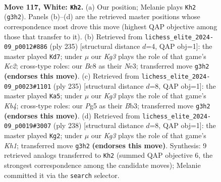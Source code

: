 \documentclass[11pt]{article}
\begin{document}
\clearpage

\begin{figure}[p]\centering
\begin{subfigure}{0.46\textwidth}\centering
\resizebox{\linewidth}{!}{%
\newchessgame
\chessboard[
  setfen={2B5/6k1/8/6PP/8/6K1/8/1n6 w - - 3 117},
  showmover=false,
  pgfstyle=straightmove, color=movearrow, markmove={g3-h2}
]}
\caption{}
\end{subfigure}\hfill
\begin{subfigure}{0.46\textwidth}\centering
\resizebox{\linewidth}{!}{%
\newchessgame
\chessboard[
  setfen={8/2k1N3/8/2p5/p7/2K1n3/8/8 b - - 13 118},
  showmover=false,
  pgfstyle=straightmove, color=movearrow, markmove={c7-d7}
]}
\caption{}
\end{subfigure}
\\[4pt]
\begin{subfigure}{0.46\textwidth}\centering
\resizebox{\linewidth}{!}{%
\newchessgame
\chessboard[
  setfen={8/8/8/1k6/8/pb6/8/1K6 b - - 85 118},
  showmover=false,
  pgfstyle=straightmove, color=movearrow, markmove={b5-a5}
]}
\caption{}
\end{subfigure}\hfill
\begin{subfigure}{0.46\textwidth}\centering
\resizebox{\linewidth}{!}{%
\newchessgame
\chessboard[
  setfen={8/5k2/8/5P2/4n3/8/8/7K w - - 81 120},
  showmover=false,
  pgfstyle=straightmove, color=movearrow, markmove={h1-g2}
]}
\caption{}
\end{subfigure}
\caption{\textbf{Move 117, White: \texttt{Kh2}.} (a) Our position; Melanie plays \texttt{Kh2} (\texttt{g3h2}). Panels (b)--(d) are the retrieved master positions whose correspondence most drove this move (highest QAP objective among those that transfer to it). (b) Retrieved from \texttt{lichess\_elite\_2024-09\_p0012\#886} (ply 235) [structural distance $d$=4, QAP obj=1]: the master played \texttt{Kd7}; under $\mu$ our \emph{Kg3} plays the role of that game's \emph{Kc2}; cross-type roles: our \emph{B}c8 as their \emph{N}e3; transferred move \texttt{g3h2} \textbf{(endorses this move)}. (c) Retrieved from \texttt{lichess\_elite\_2024-09\_p0023\#1101} (ply 235) [structural distance $d$=8, QAP obj=1]: the master played \texttt{Ka5}; under $\mu$ our \emph{Kg3} plays the role of that game's \emph{Kb4}; cross-type roles: our \emph{P}g5 as their \emph{B}b3; transferred move \texttt{g3h2} \textbf{(endorses this move)}. (d) Retrieved from \texttt{lichess\_elite\_2024-09\_p0019\#3007} (ply 238) [structural distance $d$=8, QAP obj=1]: the master played \texttt{Kg2}; under $\mu$ our \emph{Kg3} plays the role of that game's \emph{Kh1}; transferred move \texttt{g3h2} \textbf{(endorses this move)}. Synthesis: 9 retrieved analogs transferred to \texttt{Kh2} (summed QAP objective 6, the strongest correspondence among the candidate moves); Melanie committed it via the \texttt{search} selector.}
\label{fig:thought-m232}
\end{figure}
\end{document}
